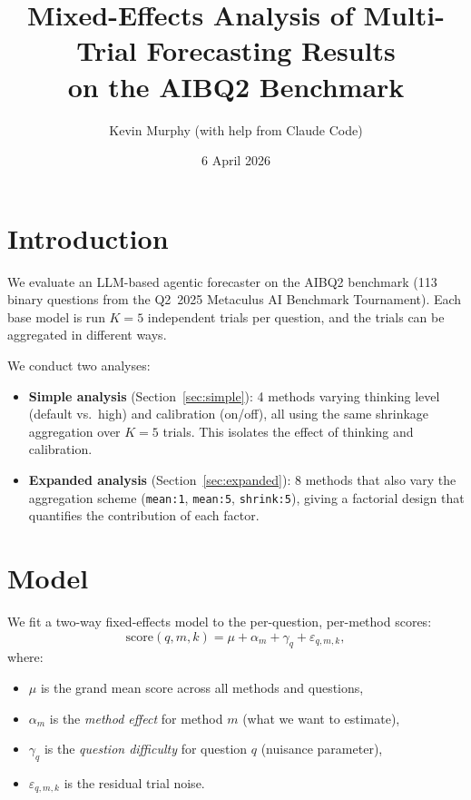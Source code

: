 \documentclass[11pt]{article}
\title{Mixed-Effects Analysis of Multi-Trial Forecasting Results\\
on the AIBQ2 Benchmark}
\author{Kevin Murphy (with help from Claude Code)}
\date{6 April 2026}
\begin{document}
\maketitle

\section{Introduction}

We evaluate an LLM-based agentic forecaster on the AIBQ2 benchmark
(113 binary questions from the Q2~2025 Metaculus AI Benchmark Tournament).
Each base model is run $K=5$ independent trials per question, and the
trials can be aggregated in different ways.

We conduct two analyses:
\begin{itemize}
  \item \textbf{Simple analysis} (Section~\ref{sec:simple}):
    4 methods varying thinking level (default vs.\ high) and calibration
    (on/off), all using the same shrinkage aggregation over $K=5$ trials.
    This isolates the effect of thinking and calibration.
  \item \textbf{Expanded analysis} (Section~\ref{sec:expanded}):
    8 methods that also vary the aggregation scheme
    (\texttt{mean:1}, \texttt{mean:5}, \texttt{shrink:5}),
    giving a factorial design that quantifies the contribution of each factor.
\end{itemize}


\section{Model}

We fit a two-way fixed-effects model to the per-question, per-method scores:
\begin{equation}
  \mathrm{score}(q, m, k) = \mu + \alpha_m + \gamma_q + \varepsilon_{q,m,k},
  \label{eq:model}
\end{equation}
where:
\begin{itemize}
  \item $\mu$ is the grand mean score across all methods and questions,
  \item $\alpha_m$ is the \emph{method effect} for method $m$ (what we want to estimate),
  \item $\gamma_q$ is the \emph{question difficulty} for question $q$ (nuisance parameter),
  \item $\varepsilon_{q,m,k}$ is the residual trial noise.
\end{itemize}
\end{document}
